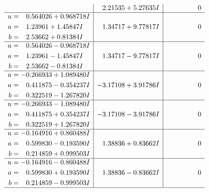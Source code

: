 \documentclass[1p]{elsarticle_modified}
\theoremstyle{definition}
\begin{document}
$$\begin{array}{c|c|c}
 & \phantom{-}2.21535 + 5.27635 I & \phantom{-0.000000 } 0 \\ \hline\begin{aligned}
u &= \phantom{-}0.564026 + 0.968718 I \\
a &= \phantom{-}1.23961 + 1.45847 I \\
b &= \phantom{-}2.53662 + 0.81384 I\end{aligned}
 & \phantom{-}1.34717 + 9.77817 I & \phantom{-0.000000 } 0 \\ \hline\begin{aligned}
u &= \phantom{-}0.564026 - 0.968718 I \\
a &= \phantom{-}1.23961 - 1.45847 I \\
b &= \phantom{-}2.53662 - 0.81384 I\end{aligned}
 & \phantom{-}1.34717 - 9.77817 I & \phantom{-0.000000 } 0 \\ \hline\begin{aligned}
u &= -0.266933 + 1.089480 I \\
a &= \phantom{-}0.411875 - 0.354237 I \\
b &= \phantom{-}0.322519 - 1.267820 I\end{aligned}
 & -3.17108 + 3.91786 I & \phantom{-0.000000 } 0 \\ \hline\begin{aligned}
u &= -0.266933 - 1.089480 I \\
a &= \phantom{-}0.411875 + 0.354237 I \\
b &= \phantom{-}0.322519 + 1.267820 I\end{aligned}
 & -3.17108 - 3.91786 I & \phantom{-0.000000 } 0 \\ \hline\begin{aligned}
u &= -0.164916 + 0.860488 I \\
a &= \phantom{-}0.599830 - 0.193590 I \\
b &= \phantom{-}0.214859 + 0.999503 I\end{aligned}
 & \phantom{-}1.38836 + 0.83662 I & \phantom{-0.000000 } 0 \\ \hline\begin{aligned}
u &= -0.164916 - 0.860488 I \\
a &= \phantom{-}0.599830 + 0.193590 I \\
b &= \phantom{-}0.214859 - 0.999503 I\end{aligned}
 & \phantom{-}1.38836 - 0.83662 I & \phantom{-0.000000 } 0\\
 \hline 
 \end{array}$$\newpage$$\begin{array}{c|c|c}  

\end{array}$$
\end{document}
